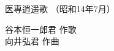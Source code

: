 \documentclass[10pt,b5j]{tarticle} %
\begin{document}
\begin{minipage}[c]{0.7\hsize} %
    \begin{center}
        {\LARGE
            医専逍遥歌 %
        }
        {\small 
            （昭和14年7月） %
        }
    \end{center}
\end{minipage}
\begin{minipage}[c]{0.3\hsize} %
    \begin{flushright} %
        谷本恒一郎君 作歌\\向井弘君 作曲 %
    \end{flushright}
\end{minipage}
\end{document}
